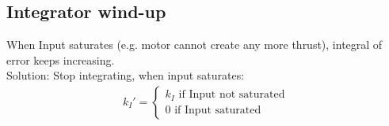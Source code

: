 \subsection*{Integrator wind-up}
    When Input saturates (e.g. motor cannot create any more thrust), integral of error keeps increasing.\\
    Solution: Stop integrating, when input saturates:
    \begin{align*}
        k_I' = \begin{cases}
            k_I \text{ if Input not saturated}\\
            0 \text{ if Input saturated}
        \end{cases}
    \end{align*}